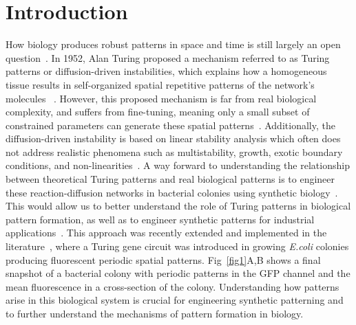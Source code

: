 \documentclass[10pt,letterpaper]{article}
\begin{document}
\linenumbers

\section*{Introduction}

How biology produces robust patterns in space and time is still largely an open question~\cite{scholes2017three}.
In 1952, Alan Turing proposed a mechanism referred to as Turing patterns or diffusion-driven instabilities, which explains how a homogeneous tissue results in self-organized spatial repetitive patterns of the network’s molecules ~\cite{Turing1952, Gierer1972}.
However, this proposed mechanism is far from real biological complexity, and suffers from fine-tuning, meaning only a small subset of constrained parameters can generate these spatial patterns~\cite{maini2012turing, Scholes2019}.
Additionally, the diffusion-driven instability is based on linear stability analysis which often does not address realistic phenomena such as multistability, growth, exotic boundary conditions, and non-linearities~\cite{Krause2023}.
A way forward to understanding the relationship between theoretical Turing patterns and real biological patterns is to engineer these reaction-diffusion networks in bacterial colonies using synthetic biology~\cite{Sekine2018, Karig2018}.
This would allow us to better understand the role of Turing patterns in biological pattern formation, as well as to engineer synthetic patterns for industrial applications~\cite{cao2017programmable, tan2018polyamide,din2020interfacing}.
This approach was recently extended and implemented in the literature~\cite{Oliver2023}, where a Turing gene circuit was introduced in growing \textit{E.coli} colonies producing fluorescent periodic spatial patterns. Fig~\ref{fig1}A,B shows a final snapshot of a bacterial colony with periodic patterns in the GFP channel and the mean fluorescence in a cross-section of the colony.
Understanding how patterns arise in this biological system is crucial for engineering synthetic patterning and to further understand the mechanisms of pattern formation in biology.
\end{document}
